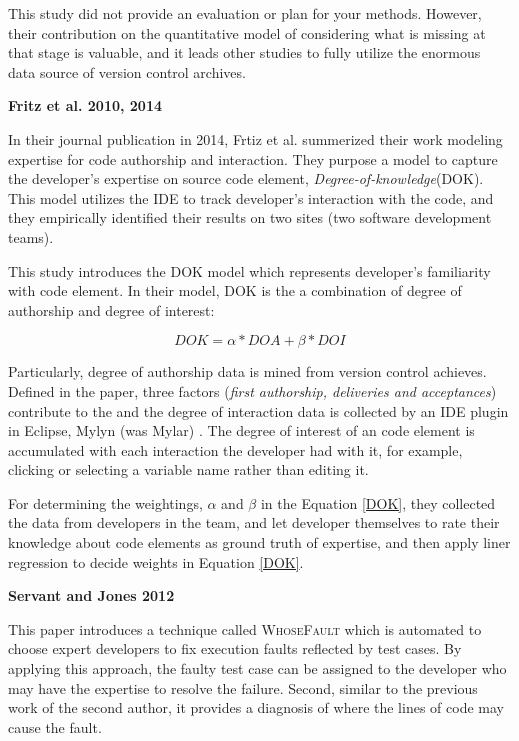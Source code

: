 This study did not provide an evaluation or plan for your methods. However, their contribution on the quantitative model of considering what is missing at that stage is valuable, and it leads other studies to fully utilize the enormous data source of version control archives.

\textbf{Fritz et al. 2010, 2014}

In their journal publication in 2014, Frtiz et al. summerized their work modeling expertise for code authorship and interaction. They purpose a model to capture the developer's expertise on source code element, \textit{Degree-of-knowledge}(DOK). This model utilizes the IDE to track developer's interaction with the code, and they empirically identified their results on two sites (two software development teams).

This study introduces the DOK model which represents developer's familiarity with code element. In their model, DOK is the a combination of degree of authorship and degree of interest:

\begin{equation}
DOK = \alpha * DOA + \beta * DOI
\label{DOK}
\end{equation}

Particularly, degree of authorship data is mined from version control achieves. Defined in the paper, three factors (\textit{first authorship, deliveries and acceptances}) contribute to the  and the degree of interaction data is collected by an IDE plugin in Eclipse, Mylyn (was Mylar) \cite{kersten2005mylar}. The degree of interest of an code element is accumulated with each interaction the developer had with it, for example, clicking or selecting a variable name rather than editing it.

For determining the weightings, $\alpha$ and $\beta$ in the Equation \ref{DOK}, they collected the data from developers in the team, and let developer themselves to rate their knowledge about code elements as ground truth of expertise, and then apply liner regression to decide weights in Equation \ref{DOK}.

\textbf{Servant and Jones 2012}

This paper introduces a technique called \textsc{WhoseFault} which is automated to choose expert developers to fix execution faults reflected by test cases. By applying this approach, the faulty test case can be assigned to the developer who may have the expertise to resolve the failure. Second, similar to the previous work of the second author, it provides a diagnosis of where the lines of code may cause the fault.

